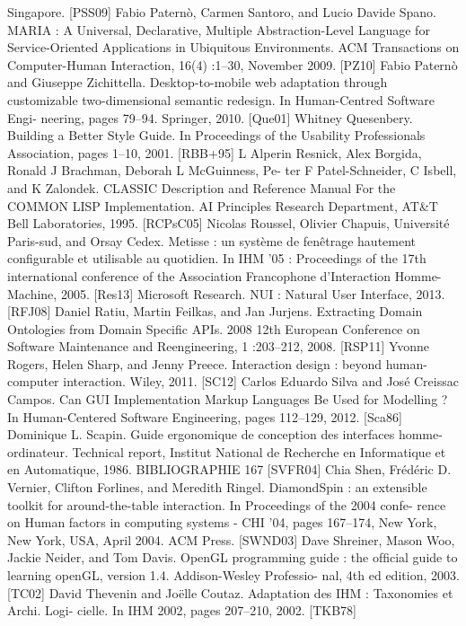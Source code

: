 \documentclass{article}
\begin{document}
Singapore.
[PSS09]
Fabio Paternò, Carmen Santoro, and Lucio Davide Spano.
MARIA : A Universal,
Declarative, Multiple Abstraction-Level Language for Service-Oriented Applications
in Ubiquitous Environments.
ACM Transactions on Computer-Human Interaction,
16(4) :1–30, November 2009.
[PZ10]
Fabio Paternò and Giuseppe Zichittella. Desktop-to-mobile web adaptation through
customizable two-dimensional semantic redesign. In Human-Centred Software Engi-
neering, pages 79–94. Springer, 2010.
[Que01]
Whitney Quesenbery. Building a Better Style Guide. In Proceedings of the Usability
Professionals Association, pages 1–10, 2001.
[RBB+95]
L Alperin Resnick, Alex Borgida, Ronald J Brachman, Deborah L McGuinness, Pe-
ter F Patel-Schneider, C Isbell, and K Zalondek. CLASSIC Description and Reference
Manual For the COMMON LISP Implementation. AI Principles Research Department,
AT&T Bell Laboratories, 1995.
[RCPsC05]
Nicolas Roussel, Olivier Chapuis, Université Paris-sud, and Orsay Cedex. Metisse :
un système de fenêtrage hautement conﬁgurable et utilisable au quotidien. In IHM
’05 : Proceedings of the 17th international conference of the Association Francophone
d’Interaction Homme-Machine, 2005.
[Res13]
Microsoft Research. NUI : Natural User Interface, 2013.
[RFJ08]
Daniel Ratiu, Martin Feilkas, and Jan Jurjens. Extracting Domain Ontologies from
Domain Speciﬁc APIs. 2008 12th European Conference on Software Maintenance and
Reengineering, 1 :203–212, 2008.
[RSP11]
Yvonne Rogers, Helen Sharp, and Jenny Preece. Interaction design : beyond human-
computer interaction. Wiley, 2011.
[SC12]
Carlos Eduardo Silva and José Creissac Campos. Can GUI Implementation Markup
Languages Be Used for Modelling ? In Human-Centered Software Engineering, pages
112–129, 2012.
[Sca86]
Dominique L. Scapin.
Guide ergonomique de conception des interfaces homme-
ordinateur.
Technical report, Institut National de Recherche en Informatique et en
Automatique, 1986.
BIBLIOGRAPHIE
167
[SVFR04]
Chia Shen, Frédéric D. Vernier, Clifton Forlines, and Meredith Ringel. DiamondSpin :
an extensible toolkit for around-the-table interaction. In Proceedings of the 2004 confe-
rence on Human factors in computing systems - CHI ’04, pages 167–174, New York,
New York, USA, April 2004. ACM Press.
[SWND03]
Dave Shreiner, Mason Woo, Jackie Neider, and Tom Davis. OpenGL programming
guide : the ofﬁcial guide to learning openGL, version 1.4. Addison-Wesley Professio-
nal, 4th ed edition, 2003.
[TC02]
David Thevenin and Joëlle Coutaz. Adaptation des IHM : Taxonomies et Archi. Logi-
cielle. In IHM 2002, pages 207–210, 2002.
[TKB78]
\end{document}

